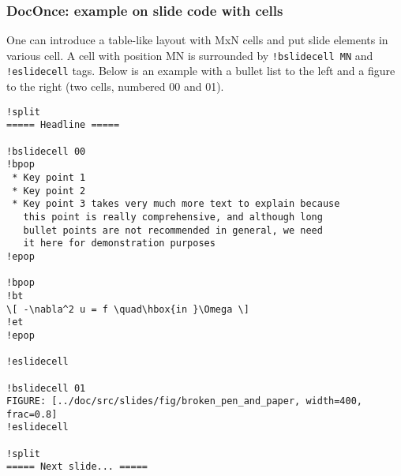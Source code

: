 \documentclass{beamer}
\begin{document}
\begin{frame}
\frametitle{DocOnce: example on slide code with cells}

One can introduce a table-like layout with MxN cells and
put slide elements in various cell. A cell with position
MN is surrounded by \Verb?!bslidecell MN? and \Verb?!eslidecell?
tags. Below is an example with a bullet list to the left and
a figure to the right (two cells, numbered 00 and 01).

\begin{Verbatim}[numbers=none,fontsize=\fontsize{9pt}{9pt},baselinestretch=0.95]
!split
===== Headline =====

!bslidecell 00
!bpop
 * Key point 1
 * Key point 2
 * Key point 3 takes very much more text to explain because
   this point is really comprehensive, and although long
   bullet points are not recommended in general, we need
   it here for demonstration purposes
!epop

!bpop
!bt
\[ -\nabla^2 u = f \quad\hbox{in }\Omega \]
!et
!epop

!eslidecell

!bslidecell 01
FIGURE: [../doc/src/slides/fig/broken_pen_and_paper, width=400, frac=0.8]
!eslidecell

!split
===== Next slide... =====
\end{Verbatim}
\end{frame}
\end{document}
